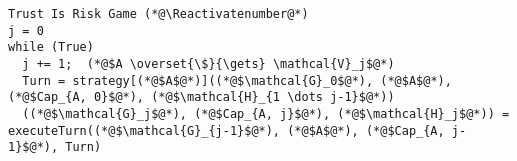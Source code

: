 {}
\Suppressnumber
\begin{lstlisting}[label=trustisriskgame, style=numbers]
Trust Is Risk Game (*@\Reactivatenumber@*)
j = 0
while (True)
  j += 1;  (*@$A \overset{\$}{\gets} \mathcal{V}_j$@*)
  Turn = strategy[(*@$A$@*)]((*@$\mathcal{G}_0$@*), (*@$A$@*), (*@$Cap_{A, 0}$@*), (*@$\mathcal{H}_{1 \dots j-1}$@*))
  ((*@$\mathcal{G}_j$@*), (*@$Cap_{A, j}$@*), (*@$\mathcal{H}_j$@*)) = executeTurn((*@$\mathcal{G}_{j-1}$@*), (*@$A$@*), (*@$Cap_{A, j-1}$@*), Turn)
\end{lstlisting}

